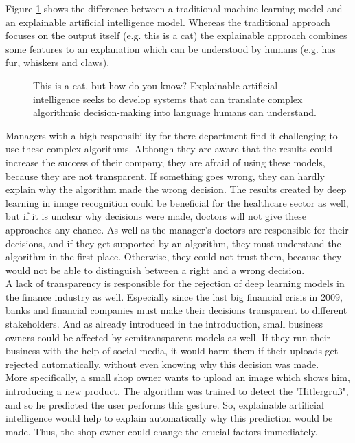 Figure \ref{fig:xai-old-vs-new} shows the difference between a traditional machine learning model and an explainable artificial intelligence model. Whereas the traditional approach focuses on the output itself (e.g. this is a cat) the explainable approach combines some features to an explanation which can be understood by humans (e.g. has fur, whiskers and claws).\\

\begin{figure}[htp]
	\centering
	\caption{This is a cat, but how do you know? Explainable artificial intelligence seeks to develop systems that can translate complex algorithmic decision-making into language humans can understand.\cite{Robinson2017}}
	\label{fig:xai-old-vs-new}
\end{figure}

Managers with a high responsibility for there department find it challenging to use these complex algorithms. Although they are aware that the results could increase the success of their company, they are afraid of using these models, because they are not transparent. If something goes wrong, they can hardly explain why the algorithm made the wrong decision. The results created by deep learning in image recognition could be beneficial for the healthcare sector as well, but if it is unclear why decisions were made, doctors will not give these approaches any chance. As well as the manager's doctors are responsible for their decisions, and if they get supported by an algorithm, they must understand the algorithm in the first place. Otherwise, they could not trust them, because they would not be able to distinguish between a right and a wrong decision.\\

A lack of transparency is responsible for the rejection of deep learning models in the finance industry as well. Especially since the last big financial crisis in 2009, banks and financial companies must make their decisions transparent to different stakeholders. And as already introduced in the introduction, small business owners could be affected by semitransparent models as well. If they run their business with the help of social media, it would harm them if their uploads get rejected automatically, without even knowing why this decision was made.\\

More specifically, a small shop owner wants to upload an image which shows him, introducing a new product. The algorithm was trained to detect the "Hitlergruß", and so he predicted the user performs this gesture. So, explainable artificial intelligence would help to explain automatically why this prediction would be made. Thus, the shop owner could change the crucial factors immediately.\\\\


